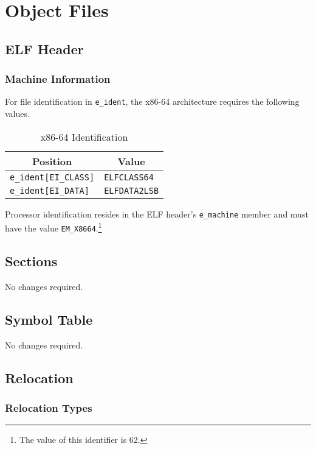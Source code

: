 
\chapter{Object Files}

\section{ELF Header}

\subsection{Machine Information}

For file identification in \texttt{e_ident}, the x86-64 architecture
requires the following values.

\begin{table}[H]
  \begin{center}
    \begin{tabular}[t]{l|l}
      \multicolumn{1}{c}{Position} & \multicolumn{1}{c}{Value} \\
      \hline
      \texttt{e_ident[EI_CLASS]} & \texttt{ELFCLASS64} \\
      \texttt{e_ident[EI_DATA]} & \texttt{ELFDATA2LSB}
    \end{tabular}
  \end{center}
  \caption{x86-64 Identification}
\end{table}

Processor identification resides in the ELF header's
\texttt{e_machine} member and must have the value
\texttt{EM_X8664}.\footnote{The value of this identifier is 62.}

\section{Sections}

No changes required.

\section{Symbol Table}

No changes required.

\section{Relocation}

\subsection{Relocation Types}

